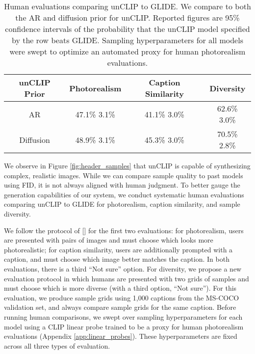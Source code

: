 \documentclass{article}
\newcommand{\namecite}[1]{\citeauthor{#1} [\citenum{#1}]}
\newcommand{\modelname}{unCLIP}
\begin{document}
\begin{table}[t]
    \begin{center}
    \begin{tabular}{cccc}
    \toprule
    unCLIP Prior & Photorealism & Caption Similarity & Diversity \\
    \midrule
    AR & 47.1\%  3.1\% & 41.1\%  3.0\% & 62.6\%  3.0\% \\
    Diffusion & 48.9\%  3.1\% & 45.3\%  3.0\% & 70.5\%  2.8\% \\
    \bottomrule
    \end{tabular}
    \end{center}
    \caption{\label{tab:humaneval_realism} Human evaluations comparing \modelname{} to GLIDE. We compare to both the AR and diffusion prior for \modelname{}. Reported figures are 95\% confidence intervals of the probability that the \modelname{} model specified by the row beats GLIDE. Sampling hyperparameters for all models were swept to optimize an automated proxy for human photorealism evaluations.}
    \vskip -0.2in
\end{table}

We observe in Figure \ref{fig:header_samples} that \modelname{} is capable of synthesizing complex, realistic images. While we can compare sample quality to past models using FID, it is not always aligned with human judgment. To better gauge the generation capabilities of our system, we conduct systematic human evaluations comparing \modelname{} to GLIDE for photorealism, caption similarity, and sample diversity. 

We follow the protocol of \namecite{dalle,glide} for the first two evaluations: for photorealism, users are presented with pairs of images and must choose which looks more photorealistic; for caption similarity, users are additionally prompted with a caption, and must choose which image better matches the caption. In both evaluations, there is a third ``Not sure'' option. For diversity, we propose a new evaluation protocol in which humans are presented with two  grids of samples and must choose which is more diverse (with a third option, ``Not sure''). For this evaluation, we produce sample grids using 1,000 captions from the MS-COCO validation set, and always compare sample grids for the same caption. Before running human comparisons, we swept over sampling hyperparameters for each model using a CLIP linear probe trained to be a proxy for human photorealism evaluations (Appendix \ref{app:linear_probes}). These hyperparameters are fixed across all three types of evaluation.
\end{document}
